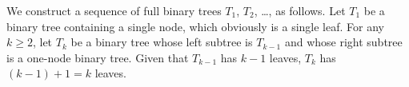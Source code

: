 \exercise
We construct a sequence of full binary trees $T_1$, $T_2$, \dots, as follows.
Let $T_1$ be a binary tree containing a single node, which obviously is a single leaf.
For any $k\ge2$, let $T_k$ be a binary tree whose left subtree is $T_{k-1}$ and whose right subtree is a one-node binary tree.
Given that $T_{k-1}$ has $k-1$ leaves, $T_k$ has $(k-1)+1=k$ leaves.
